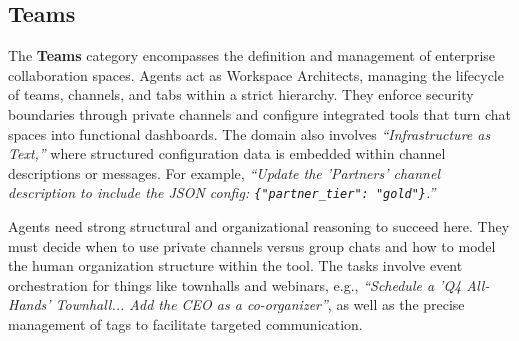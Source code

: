 \subsection{Teams}
\label{app:cat_teams}

The \textbf{Teams} category encompasses the definition and management of enterprise collaboration spaces. Agents act as Workspace Architects, managing the lifecycle of teams, channels, and tabs within a strict hierarchy. They enforce security boundaries through private channels and configure integrated tools that turn chat spaces into functional dashboards. The domain also involves \textit{``Infrastructure as Text,''} where structured configuration data is embedded within channel descriptions or messages. For example, \textit{``Update the 'Partners' channel description to include the JSON config: \texttt{\{"partner\_tier": "gold"\}}.''}

Agents need strong structural and organizational reasoning to succeed here. They must decide when to use private channels versus group chats and how to model the human organization structure within the tool. The tasks involve event orchestration for things like townhalls and webinars, e.g., \textit{``Schedule a 'Q4 All-Hands' Townhall... Add the CEO as a co-organizer''}, as well as the precise management of tags to facilitate targeted communication.

